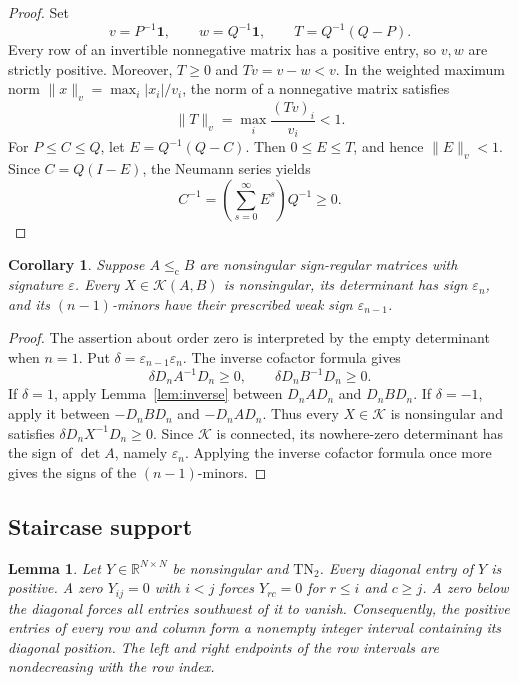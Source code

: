\documentclass[10pt,a4paper]{article}
\newtheorem{lemma}[theorem]{Lemma}
\newtheorem{corollary}[theorem]{Corollary}
\theoremstyle{definition}
\theoremstyle{remark}
\numberwithin{equation}{section}
\newcommand{\R}{\mathbb R}
\newcommand{\eps}{\varepsilon}
\newcommand{\K}{\mathcal K}
\newcommand{\chle}{\leq_{\mathrm c}}
\newcommand{\one}{\mathbf 1}
\begin{document}
\begin{proof}
Set
\[
 v=P^{-1}\one,\qquad w=Q^{-1}\one,\qquad T=Q^{-1}(Q-P).
\]
Every row of an invertible nonnegative matrix has a positive entry,
so $v,w$ are strictly positive. Moreover, $T\geq0$ and
$Tv=v-w<v$. In the weighted maximum norm
$\|x\|_v=\max_i|x_i|/v_i$, the norm of a nonnegative matrix satisfies
\[
 \|T\|_v=\max_i\frac{(Tv)_i}{v_i}<1.
\]
For $P\leq C\leq Q$, let $E=Q^{-1}(Q-C)$. Then
$0\leq E\leq T$, and hence $\|E\|_v<1$. Since $C=Q(I-E)$,
the Neumann series yields
\[
 C^{-1}=\left(\sum_{s=0}^{\infty}E^s\right)Q^{-1}\geq0.
\]
\end{proof}

\begin{corollary}\label{cor:nonsingular}
Suppose $A\chle B$ are nonsingular sign-regular matrices with
signature $\eps$. Every $X\in\K(A,B)$ is nonsingular, its determinant
has sign $\eps_n$, and its $(n-1)$-minors have their prescribed weak
sign $\eps_{n-1}$.
\end{corollary}

\begin{proof}
The assertion about order zero is interpreted by the empty determinant
when $n=1$. Put $\delta=\eps_{n-1}\eps_n$. The inverse cofactor formula
gives
\[
 \delta D_nA^{-1}D_n\geq0,\qquad
 \delta D_nB^{-1}D_n\geq0.
\]
If $\delta=1$, apply Lemma~\ref{lem:inverse} between $D_nAD_n$ and
$D_nBD_n$. If $\delta=-1$, apply it between $-D_nBD_n$ and
$-D_nAD_n$. Thus every $X\in\K$ is nonsingular and satisfies
$\delta D_nX^{-1}D_n\geq0$. Since $\K$ is connected, its nowhere-zero
determinant has the sign of $\det A$, namely $\eps_n$.
Applying the inverse cofactor formula once more gives the signs of the
$(n-1)$-minors.
\end{proof}

\subsection{Staircase support}

\begin{lemma}\label{lem:staircase}
Let $Y\in\R^{N\times N}$ be nonsingular and $\mathrm{TN}_2$.
Every diagonal entry of $Y$ is positive. A zero $Y_{ij}=0$ with $i<j$
forces $Y_{rc}=0$ for $r\leq i$ and $c\geq j$. A zero below the
diagonal forces all entries southwest of it to vanish. Consequently,
the positive entries of every row and column form a nonempty integer
interval containing its diagonal position. The left and right endpoints
of the row intervals are nondecreasing with the row index.
\end{lemma}
\end{document}
